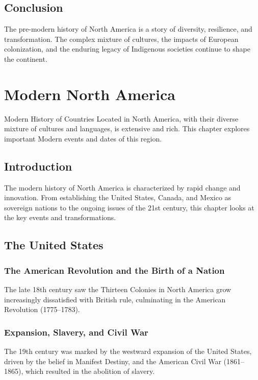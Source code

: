 \documentclass{book}
\begin{document}
\section{Conclusion}
\label{sec:conclusion-north-america}
The pre-modern history of North America is a story of diversity, resilience, and transformation. The complex mixture of cultures, the impacts of European colonization, and the enduring legacy of Indigenous societies continue to shape the continent.

\chapter{Modern North America}
\label{ch:modern-history-north-america}

Modern History of Countries Located in North America, with their diverse mixture of cultures and languages, is extensive and rich. This chapter explores important Modern events and dates of this region.

\section{Introduction}
\label{sec:introduction-north-america-modern}
The modern history of North America is characterized by rapid change and innovation. From establishing the United States, Canada, and Mexico as sovereign nations to the ongoing issues of the 21st century, this chapter looks at the key events and transformations.

\section{The United States}
\label{sec:united-states}

\subsection{The American Revolution and the Birth of a Nation}
The late 18th century saw the Thirteen Colonies in North America grow increasingly dissatisfied with British rule, culminating in the American Revolution (1775–1783).

\subsection{Expansion, Slavery, and Civil War}
The 19th century was marked by the westward expansion of the United States, driven by the belief in Manifest Destiny, and the American Civil War (1861–1865), which resulted in the abolition of slavery.
\end{document}
